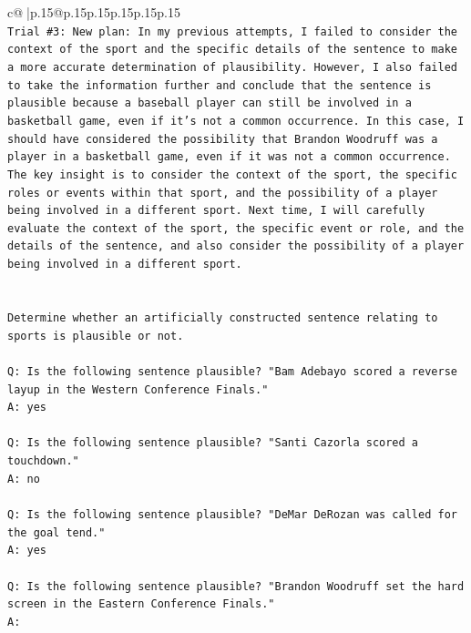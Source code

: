 \documentclass{article}
\begin{document}
{\begin{supertabular}{c@{$\;$}|p{.15\linewidth}@{}p{.15\linewidth}p{.15\linewidth}p{.15\linewidth}p{.15\linewidth}p{.15\linewidth}}
{{{\\ 
\texttt{Trial \#3: New plan: In my previous attempts, I failed to consider the context of the sport and the specific details of the sentence to make a more accurate determination of plausibility. However, I also failed to take the information further and conclude that the sentence is plausible because a baseball player can still be involved in a basketball game, even if it's not a common occurrence. In this case, I should have considered the possibility that Brandon Woodruff was a player in a basketball game, even if it was not a common occurrence. The key insight is to consider the context of the sport, the specific roles or events within that sport, and the possibility of a player being involved in a different sport. Next time, I will carefully evaluate the context of the sport, the specific event or role, and the details of the sentence, and also consider the possibility of a player being involved in a different sport.} \\
\\ 
\\ 
\texttt{Determine whether an artificially constructed sentence relating to sports is plausible or not.} \\
\\ 
\texttt{Q: Is the following sentence plausible? "Bam Adebayo scored a reverse layup in the Western Conference Finals."} \\
\texttt{A: yes} \\
\\ 
\texttt{Q: Is the following sentence plausible? "Santi Cazorla scored a touchdown."} \\
\texttt{A: no} \\
\\ 
\texttt{Q: Is the following sentence plausible? "DeMar DeRozan was called for the goal tend."} \\
\texttt{A: yes} \\
\\ 
\texttt{Q: Is the following sentence plausible? "Brandon Woodruff set the hard screen in the Eastern Conference Finals."} \\
\texttt{A:} \\
            }
        }
    }
     \\ \\


\end{supertabular}}
\end{document}
